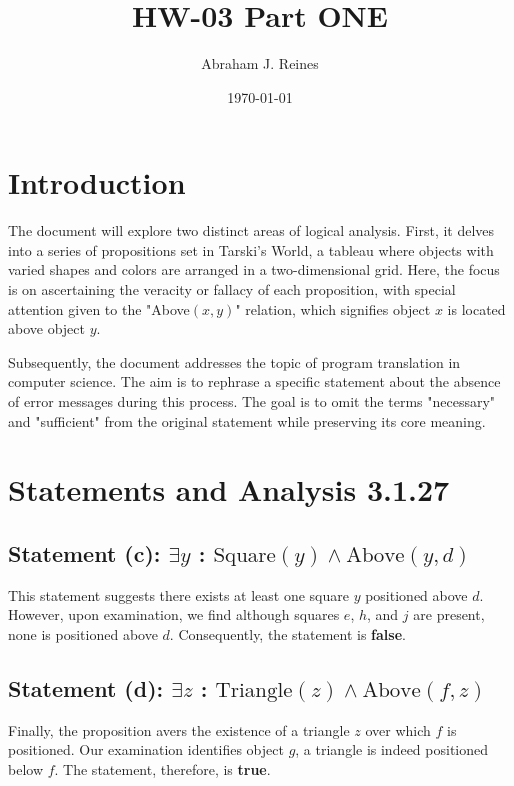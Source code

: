 \documentclass[12pt]{article}
\begin{document}
\doublespacing

\title{HW-03 Part ONE}
\author{Abraham J. Reines}
\date{\today}
\maketitle

\section{Introduction}
The document will explore two distinct areas of logical analysis. First, it delves into a series of propositions set in Tarski's World, a tableau where objects with varied shapes and colors are arranged in a two-dimensional grid. Here, the focus is on ascertaining the veracity or fallacy of each proposition, with special attention given to the "Above\((x, y)\)" relation, which signifies object \(x\) is located above object \(y\).

Subsequently, the document addresses the topic of program translation in computer science. The aim is to rephrase a specific statement about the absence of error messages during this process. The goal is to omit the terms "necessary" and "sufficient" from the original statement while preserving its core meaning.

\section{Statements and Analysis 3.1.27}

\subsection{Statement (c): \( \exists y \) : \( \text{Square}(y) \land \text{Above}(y, d) \)}
This statement suggests there exists at least one square \( y \) positioned above \( d \). However, upon examination, we find although squares \( e \), \( h \), and \( j \) are present, none is positioned above \( d \). Consequently, the statement is \textbf{false}.

\subsection{Statement (d): \( \exists z \) : \( \text{Triangle}(z) \land \text{Above}(f, z) \)}
Finally, the proposition avers the existence of a triangle \( z \) over which \( f \) is positioned. Our examination identifies object \( g \), a triangle is indeed positioned below \( f \). The statement, therefore, is \textbf{true}.
\end{document}
